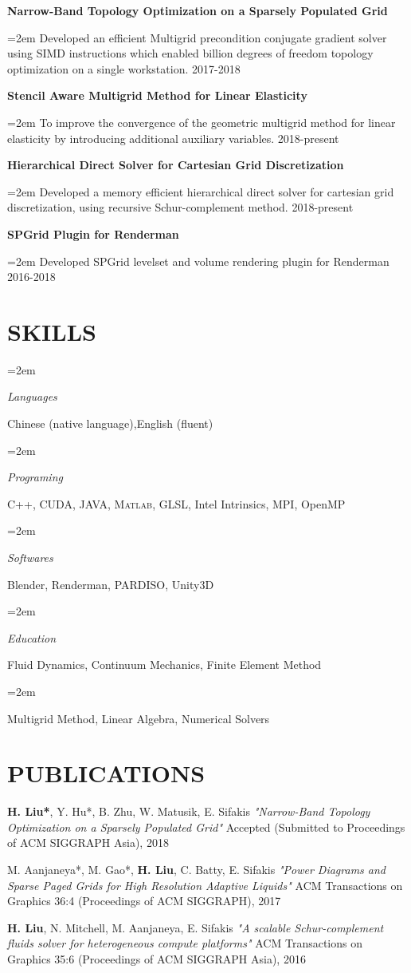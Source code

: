 \documentclass[paper=a4,fontsize=10pt]{scrartcl} %
\newlength{\spacebox}
\newcommand{\NewPart}[1]{\section*{\uppercase{#1}}\vspace*{-0.3em}}
\newcommand{\PersonalEntry}[2]{
		\noindent\hangindent=2em\hangafter=0 %
		\parbox{\spacebox}{        %
		\textit{#1}}		       %
		\hspace{1.5em} #2 \par}    %
\newcommand{\SkillsEntry}[2]{      %
		\noindent\hangindent=2em\hangafter=0 %
		\parbox{\spacebox}{        %
		\textit{#1}}			   %
		\hspace{1.5em} #2 \par}    %
\newcommand{\ReferenceEntry}[4]{				  %
		\noindent\hangindent=2em\hangafter=0\textbf{#1} #2 \par  %
		\hspace{2.5em} \textit{#3} \par              %
		\hspace{2.5em} \small #4 %
		\normalsize \par}
\newcommand{\EducationEntry}[4]{
		\noindent \textbf{#1} \hfill      %
		\colorbox{White}{%
			\parbox{6em}{%
			\hfill\color{Black}#2}} \par  %
		\noindent \textit{#3} \par        %
		\noindent\hangindent=2em\hangafter=0 \small #4 %
		\normalsize \par}
\newcommand{\ResearchEntry}[3]{				  %
		\noindent \textbf{#1} \hfill    \par%
		\noindent\hangindent=2em\hangafter=0 \small #3 %
		\hfill \colorbox{White}{\color{Black}#2}   %
		\normalsize \par}
\newcommand{\Publication}[3]{	\indent	  
		\noindent #1\small       %
		\noindent \textit{#2} %
		\noindent #3\small \par              %
		\normalsize \par}
\begin{document}
\ResearchEntry{Narrow-Band Topology Optimization on a Sparsely Populated Grid}{2017-2018}{Developed an efficient Multigrid precondition conjugate gradient solver using SIMD instructions which enabled billion degrees of freedom topology optimization on a single workstation.}
\ResearchEntry{Stencil Aware Multigrid Method for Linear Elasticity}{2018-present}{To improve the convergence of the geometric multigrid method for linear elasticity by introducing additional auxiliary variables.}
\ResearchEntry{Hierarchical Direct Solver for Cartesian Grid Discretization}{2018-present}{Developed a memory efficient hierarchical direct solver for cartesian grid discretization, using recursive Schur-complement method. }
\ResearchEntry{SPGrid Plugin for Renderman\texttrademark}{2016-2018}{Developed SPGrid levelset and volume rendering plugin for Renderman\texttrademark}
\vspace*{-1.2em}
\NewPart{Skills}{}
\SkillsEntry{Languages}{Chinese (native language),English (fluent)}
\SkillsEntry{Programing}{\textsc{C++}, \textsc{CUDA},  \textsc{JAVA}, \textsc{Matlab}, GLSL, Intel Intrinsics, MPI, OpenMP}
\SkillsEntry{Softwares} {Blender, Renderman, PARDISO, Unity3D}
\SkillsEntry{Education}{Fluid Dynamics, Continuum Mechanics, Finite Element Method}
\SkillsEntry{}{Multigrid Method, Linear Algebra, Numerical Solvers}
\vspace*{-1.2em}
\NewPart{Publications}{}
\Publication{\textbf{H. Liu*}, Y. Hu*, B. Zhu, W. Matusik, E. Sifakis}{ "Narrow-Band Topology Optimization on a Sparsely Populated Grid"}{ Accepted (Submitted to Proceedings of ACM SIGGRAPH Asia), 2018}
\Publication{M. Aanjaneya*, M. Gao*, \textbf{H. Liu}, C. Batty, E. Sifakis }{"Power Diagrams and Sparse Paged Grids for High Resolution Adaptive Liquids"}{ACM Transactions on Graphics 36:4 (Proceedings of ACM SIGGRAPH), 2017}
\Publication{\textbf{H. Liu}, N. Mitchell, M. Aanjaneya, E. Sifakis}{ "A scalable Schur-complement fluids solver for heterogeneous compute platforms"}{ ACM Transactions on Graphics 35:6 (Proceedings of ACM SIGGRAPH Asia), 2016}
\end{document}

